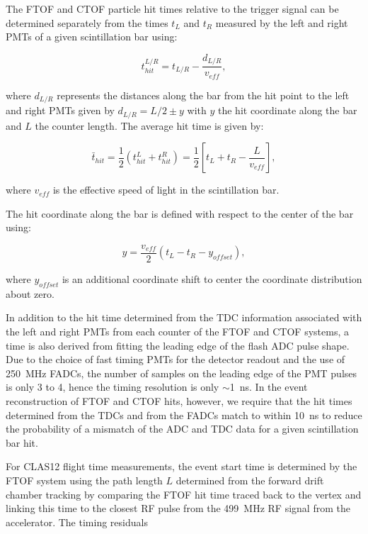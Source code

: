 \documentclass{elsart}
\begin{document}
The FTOF and CTOF particle hit times relative to the trigger signal can be determined separately from the times
$t_L$ and $t_R$ measured by the left and right PMTs of a given scintillation bar using:

\begin{equation}
t_{hit}^{L/R} = t_{L/R} - \frac{d_{L/R}}{v_{eff}},
\end{equation}

\noindent
where $d_{L/R}$ represents the distances along the bar from the hit point to the left and right PMTs given by
$d_{L/R}= L/2 \pm y$ with $y$ the hit coordinate along the bar and $L$ the counter length. The average hit time
is given by:

\begin{equation}
\bar{t}_{hit} = \frac{1}{2} ( t_{hit}^L + t_{hit}^R ) = \frac{1}{2} \left[ t_L + t_R - \frac{L}{v_{eff}} \right],
\end{equation}

\noindent
where $v_{eff}$ is the effective speed of light in the scintillation bar.

The hit coordinate along the bar is defined with respect to the center of the bar using:

\begin{equation}
  \label{tof-coor}
  y = \frac{v_{eff}}{2} (t_L - t_R - y_{offset}),
\end{equation}

\noindent
where $y_{offset}$ is an additional coordinate shift to center the coordinate distribution about zero.

In addition to the hit time determined from the TDC information associated with the left and right PMTs
from each counter of the FTOF and CTOF systems, a time is also derived from fitting the leading edge of
the flash ADC pulse shape. Due to the choice of fast timing PMTs for the detector readout and the use of
250~MHz FADCs, the number of samples on the leading edge of the PMT pulses is only 3 to 4, hence
the timing resolution is only $\sim$1~ns. In the event reconstruction of FTOF and CTOF hits, however, we
require that the hit times determined from the TDCs and from the FADCs match to within 10~ns to
reduce the probability of a mismatch of the ADC and TDC data for a given scintillation bar hit.

For CLAS12 flight time measurements, the event start time is determined by the FTOF system using the
path length $L$ determined from the forward drift chamber tracking by comparing the FTOF hit time
traced back to the vertex and linking this time to the closest RF pulse from the 499~MHz RF signal from
the accelerator. The timing residuals
\end{document}
